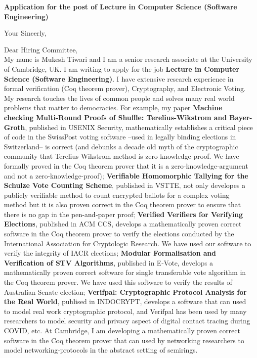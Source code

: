 \documentclass[11pt,a4paper,roman]{moderncv}
\begin{document}
\date{}
\opening{\textbf{Application for the post of Lecture in Computer Science (Software Engineering)}}
\closing{Your Sincerly, \vspace{-1em}}



\makelettertitle


Dear Hiring Committee, 
\\
\vspace{1em}
My name is Mukesh Tiwari and I am a senior research associate at 
the University of Cambridge, UK. I am writing to apply
for the job \textbf{Lecture in Computer Science (Software Engineering)}. 
I have extensive research experience in
formal verification (Coq theorem prover), Cryptography, and Electronic Voting.
My research touches the lives of common people and solves 
many real world problems that matter to democracies. For example, my paper 
\textbf{Machine checking Multi-Round Proofs of Shuffle: Terelius-Wikstrom and Bayer-Groth}, 
published in USENIX Security, mathematically establishes a critical piece of 
code in the SwissPost voting software --used in legally binding 
elections in Switzerland-- is correct (and debunks a decade old myth of the cryptographic 
community that Terelius-Wikstrom method is zero-knowledge-proof. We have formally 
proved in the Coq theorem prover that it is a zero-knowledge-argument and not 
a zero-knowledge-proof);
\textbf{Verifiable Homomorphic Tallying for the Schulze Vote Counting Scheme}, published 
in VSTTE, not only developes a publicly verifiable method to count encrypted ballots for a complex voting method but it 
is also proven correct in the Coq theorem prover to ensure that there is no gap in 
the pen-and-paper proof; 
\textbf{Verified Verifiers for 
Verifying Elections}, published in ACM CCS, develops a mathematically proven correct software 
in the Coq theorem prover to verify the elections conducted by 
the International Association for Cryptologic Research. We have used 
our software to verify the integrity of IACR elections; \textbf{Modular Formalisation and 
Verification of STV Algorithms}, published in E-Vote, develops a mathematically proven 
correct software for single transferable vote algorithm in the Coq theorem prover. We have used this software to verify
the results of Australian Senate election; 
\textbf{Verifpal: Cryptographic Protocol Analysis for the Real World}, publised in 
INDOCRYPT, develops a software that can used to model real work cryptographic protocol, and 
Verifpal has been used by many researchers to model security and privacy aspect of 
digital contact tracing during COVID, etc.
At Cambridge, I am developing a mathematically proven correct software in the Coq theorem prover 
that can used by networking researchers to model networking-protocols in the abstract 
setting of semirings.
\end{document}
